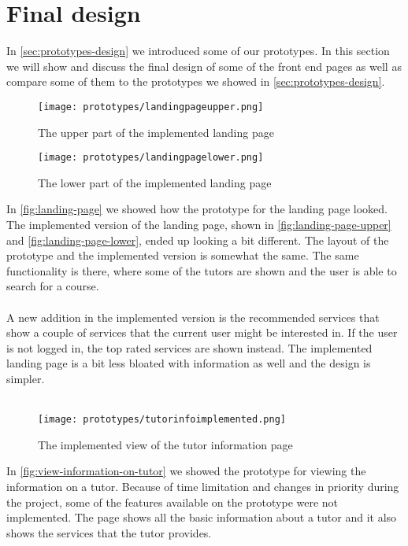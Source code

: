 \section{Final design}
In \autoref{sec:prototypes-design} we introduced some of our prototypes.
In this section we will show and discuss the final design of some of the front end pages as well as compare some of them to the prototypes we showed in \autoref{sec:prototypes-design}.
\begin{figure}
    \centering
    \texttt{[image: prototypes/landingpageupper.png]} 
    \caption{The upper part of the implemented landing page}
    \label{fig:landing-page-upper}
\end{figure}
\begin{figure}
    \centering
    \texttt{[image: prototypes/landingpagelower.png]} 
    \caption{The lower part of the implemented landing page}
    \label{fig:landing-page-lower}
\end{figure}
In \autoref{fig:landing-page} we showed how the prototype for the landing page looked.
The implemented version of the landing page, shown in \autoref{fig:landing-page-upper} and \autoref{fig:landing-page-lower}, ended up looking a bit different.
The layout of the prototype and the implemented version is somewhat the same. 
The same functionality is there, where some of the tutors are shown and the user is able to search for a course. 
\\\\
A new addition in the implemented version is the recommended services that show a couple of services that the current user might be interested in. 
If the user is not logged in, the top rated services are shown instead. 
The implemented landing page is a bit less bloated with information as well and the design is simpler.
\\\\
\begin{figure}
    \centering
    \texttt{[image: prototypes/tutorinfoimplemented.png]} 
    \caption{The implemented view of the tutor information page}
    \label{fig:tutor-info-implemented}
\end{figure}
In \autoref{fig:view-information-on-tutor} we showed the prototype for viewing the information on a tutor.
Because of time limitation and changes in priority during the project, some of the features available on the prototype were not implemented.
The page shows all the basic information about a tutor and it also shows the services that the tutor provides.

